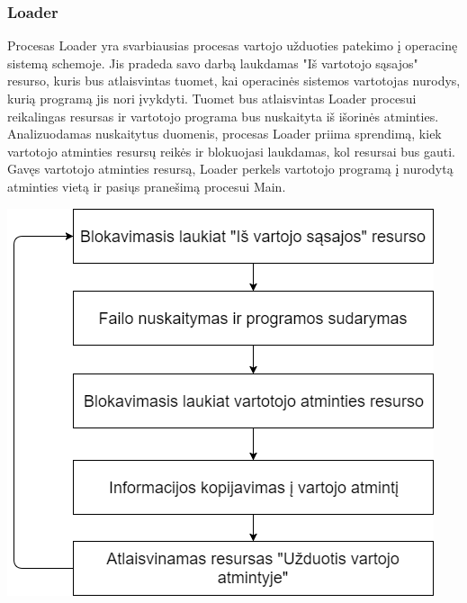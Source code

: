 \documentclass{scrartcl}
\begin{document}
      \subsubsection{Loader}
        Procesas Loader yra svarbiausias procesas vartojo užduoties patekimo į operacinę sistemą schemoje. Jis pradeda savo darbą laukdamas "Iš vartotojo sąsajos" resurso, kuris bus atlaisvintas tuomet, kai operacinės sistemos vartotojas nurodys, kurią programą jis nori įvykdyti. Tuomet bus atlaisvintas Loader procesui reikalingas resursas ir vartotojo programa bus nuskaityta iš išorinės atminties. Analizuodamas nuskaitytus duomenis, procesas Loader priima sprendimą, kiek vartotojo atminties resursų reikės ir blokuojasi laukdamas, kol resursai bus gauti. Gavęs vartotojo atminties resursą, Loader perkels vartotojo programą į nurodytą atminties vietą ir pasiųs pranešimą procesui Main.
        \begin{center}
          \includegraphics[scale=0.5]{Loader}
        \end{center}
\end{document}
